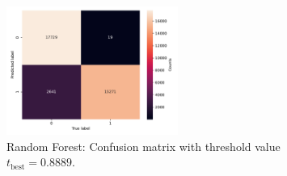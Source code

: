 \begin{figure}
    \centering
    \includegraphics[width=0.5\textwidth]{content/plots/confusion_rdm.pdf}
    \caption{Random Forest: Confusion matrix with threshold value $t_{\mathrm{best}} = \num{0.8889}$.}
    \label{fig:confusion_rdm}
\end{figure}

